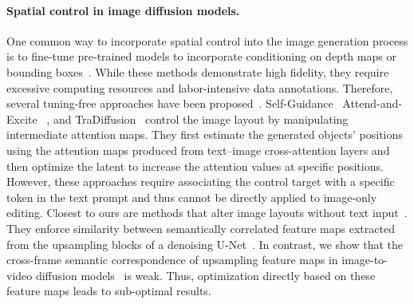 \documentclass{article} \usepackage{iclr2025_conference,times}
\begin{document}
\paragraph{Spatial control in image diffusion models.}
One common way to incorporate spatial control into the image generation process is to fine-tune pre-trained models to incorporate conditioning on depth maps or bounding boxes~\citep{ControlNet,ye2023ip,SpaText,GLIGEN,PairDiffusion,InstanceDiffusion}.
While these methods demonstrate high fidelity, they require excessive computing resources and labor-intensive data annotations. 
Therefore, several tuning-free approaches have been proposed~\citep{MasaCtrl,LayoutGuidanceAttn1,LayoutGuidanceAttn2,PromptToPrompt}.
Self-Guidance~\citep{epstein2023diffusion} Attend-and-Excite~\citep{chefer2023attend} , and TraDiffusion~\citep{wu2024tradiffusion} control the image layout by manipulating intermediate attention maps. They first estimate the generated objects' positions using the attention maps produced from text--image cross-attention layers and then optimize the latent to increase the attention values at specific positions.
However, these approaches require associating the control target with a specific token in the text prompt and thus cannot be directly applied to image-only editing.
Closest to ours are methods that alter image layouts without text input~\citep{pan2023drag,mou2023dragondiffusion,mou2024diffeditor,ling2023freedrag,liu2024drag,zhang2024gooddrag,cui2024stabledrag,hou2024easydrag,zhao2024fastdrag,shi2024dragdiffusion}.
They enforce similarity between semantically correlated feature maps extracted from the upsampling blocks of a denoising U-Net~\citep{tang2023emergent,namekata2024emerdiff,hedlin2024unsupervised,zhang2023tale,luo2023dhf}.
In contrast, we show that the cross-frame semantic correspondence of upsampling feature maps in image-to-video diffusion models~\citep{blattmann2023stable} is weak. Thus, optimization directly based on these feature maps leads to sub-optimal results.
\end{document}
